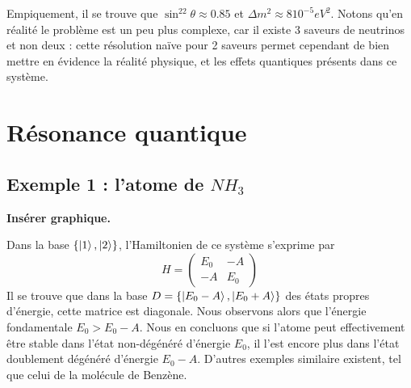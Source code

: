 \documentclass[../notesdecours.tex]{subfiles}
\begin{document}
Empiquement, il se trouve que $\sin^22\theta \approx 0.85$ et $\Delta m^2 \approx 8 10^{-5} eV^2$. Notons qu'en réalité le problème est un peu plus complexe, car il existe 3 saveurs de neutrinos et non deux : cette résolution naïve pour 2 saveurs permet cependant de bien mettre en évidence la réalité physique, et les effets quantiques présents dans ce système.



\section{Résonance quantique}

\subsection{Exemple 1 : l'atome de $NH_3$}

\color{red} \textbf{Insérer graphique.} \color{black}

Dans la base $\{\ket{1},\ket{2}\}$, l'Hamiltonien de ce système s'exprime par
\begin{equation}
    H = 
    \begin{pmatrix}
        E_0 & -A\\
        -A & E_0
    \end{pmatrix}
\end{equation}
Il se trouve que dans la base $D = \{\ket{E_0-A},\ket{E_0+A}\}$ des états propres d'énergie, cette matrice est diagonale. Nous observons alors que l'énergie fondamentale $E_0 > E_0-A$. Nous en concluons que si l'atome peut effectivement être stable dans l'état non-dégénéré d'énergie $E_0$, il l'est encore plus dans l'état doublement dégénéré d'énergie $E_0-A$. D'autres exemples similaire existent, tel que celui de la molécule de Benzène.

\end{document}
